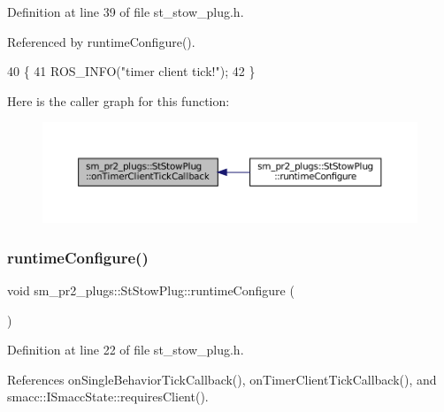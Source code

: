 Definition at line 39 of file st\+\_\+stow\+\_\+plug.\+h.



Referenced by runtime\+Configure().


\begin{DoxyCode}
40     \{
41         ROS\_INFO(\textcolor{stringliteral}{"timer client tick!"});
42     \}
\end{DoxyCode}
Here is the caller graph for this function\+:
\nopagebreak
\begin{figure}[H]
\begin{center}
\leavevmode
\includegraphics[width=350pt]{structsm__pr2__plugs_1_1StStowPlug_ae757556cb3fd58c9db771327744973bf_icgraph}
\end{center}
\end{figure}
\mbox{\label{structsm__pr2__plugs_1_1StStowPlug_a7a8c96a9affcf5e333fc0e96575141ec}} 
\subsubsection{\texorpdfstring{runtime\+Configure()}{runtimeConfigure()}}
{\footnotesize\ttfamily void sm\+\_\+pr2\+\_\+plugs\+::\+St\+Stow\+Plug\+::runtime\+Configure (\begin{DoxyParamCaption}{ }\end{DoxyParamCaption})\hspace{0.3cm}{\ttfamily [inline]}}



Definition at line 22 of file st\+\_\+stow\+\_\+plug.\+h.



References on\+Single\+Behavior\+Tick\+Callback(), on\+Timer\+Client\+Tick\+Callback(), and smacc\+::\+I\+Smacc\+State\+::requires\+Client().


